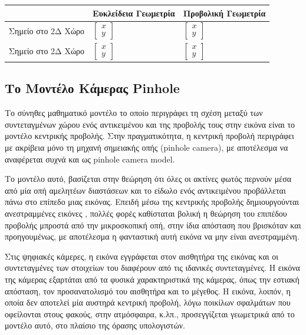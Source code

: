 \begin{tabu} to 0.9\textwidth { | X[l] | X[c,m] | X[c,m] | }
   \hline
    & Ευκλείδεια Γεωμετρία & Προβολική Γεωμετρία \\[0.5cm]
   \hline
   Σημείο στο 2Δ Χώρο  & $\begin{bmatrix} x \\ y\end{bmatrix}$  & $\begin{bmatrix} x \\ y\end{bmatrix}$  \\[1cm]
   \hline
   Σημείο στο 2Δ Χώρο  & $\begin{bmatrix} x \\ y\end{bmatrix}$  & $\begin{bmatrix} x \\ y\end{bmatrix}$  \\[1cm]
   \hline
\end{tabu}




\subsection{Το Μοντέλο Κάμερας Pinhole}


Το σύνηθες μαθηματικό μοντέλο το οποίο περιγράφει τη σχέση μεταξύ των συντεταγμένων χώρου ενός αντικειμένου και της προβολής τους στην εικόνα είναι το μοντέλο κεντρικής προβολής. Στην πραγματικότητα, η κεντρική προβολή περιγράφει με ακρίβεια μόνο τη μηχανή σημειακής οπής (pinhole camera), με αποτέλεσμα να αναφέρεται συχνά και ως pinhole camera model. 


Το μοντέλο αυτό, βασίζεται στην θεώρηση ότι όλες οι ακτίνες φωτός περνούν μέσα από μία οπή αμελητέων διαστάσεων και το είδωλο ενός αντικειμένου προβάλλεται πάνω στο επίπεδο μιας εικόνας. Επειδή μέσω της κεντρικής προβολής δημιουργούνται ανεστραμμένες εικόνες \cite{fig:pinhole3}, πολλές φορές καθίσταται βολική η θεώρηση του επιπέδου προβολής μπροστά από την μικροσκοπική οπή, στην ίδια απόσταση που βρισκόταν και προηγουμένως, με αποτέλεσμα η φανταστική αυτή εικόνα να μην είναι ανεστραμμένη. 



Στις ψηφιακές κάμερες, η εικόνα εγγράφεται στον αισθητήρα της εικόνας και οι συντεταγμένες των στοιχείων του διαφέρουν από τις ιδανικές συντεταγμένες. Η εικόνα της κάμερας εξαρτάται από τα φυσικά χαρακτηριστικά της κάμερας, όπως την εστιακή απόσταση, τον προσανατολισμό του αισθητήρα και το μέγεθος. H εικόνα, λοιπόν, η οποία δεν αποτελεί μία αυστηρά κεντρική προβολή, λόγω ποικίλων σφαλμάτων που οφείλονται στους φακούς, στην ατμόσφαιρα, κ.λπ., προσεγγίζεται γεωμετρικά από το μοντέλο αυτό, στο πλαίσιο της όρασης υπολογιστών.



